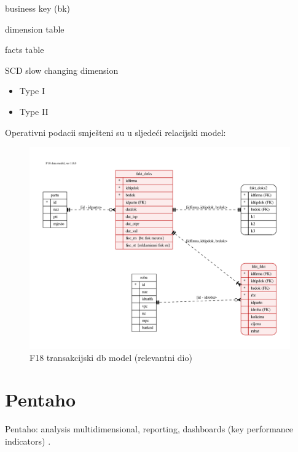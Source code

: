 \documentclass[times, utf8, seminar]{fit}
\begin{document}
business key (bk)

dimension table

facts table

SCD slow changing dimension
\begin{itemize}
  \item Type I
  \item Type II
\end{itemize}

Operativni podacii smješteni su u sljedeći relacijski model:

\begin{figure}[h]
\centering
\includegraphics[width=15cm]{img/F18_db.pdf}
\caption{F18 transakcijski db model (relevantni dio)}
\end{figure}


\section{Pentaho}

Pentaho: analysis multidimensional, reporting, dashboards (key performance indicators) \cite[str.~7]{pentaho32}.
\end{document}
